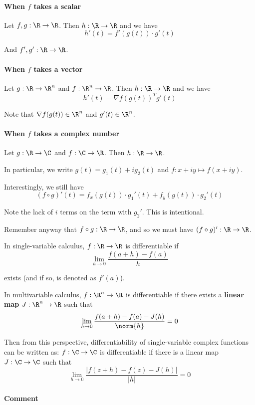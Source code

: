\paragraph{When $f$ takes a scalar} Let $f,g:\R\to\R$. Then $h:\R\to\R$ and we have
$$h'(t)=f'(g(t))\cdot g'(t)$$

And $f',g':\R\to\R$.

\paragraph{When $f$ takes a vector} Let $g:\R\to\R^n$ and $f:\R^n\to\R$. Then $h:\R\to\R$ and we have
$$h'(t)=\nabla f(g(t))^Tg'(t)$$

Note that $\nabla f(g(t))\in\R^n$ and $g'(t)\in\R^n$.

\paragraph{When $f$ takes a complex number} Let $g:\R\to\C$ and $f:\C\to\R$. Then $h:\R\to\R$.

In particular, we write $g(t)=g_1(t)+ig_2(t)$ and $f:x+iy\mapsto f(x+iy)$.

Interestingly, we still have
$$
  (f\circ g)'(t) =
  f_x(g(t))\cdot {g_1}'(t)+f_y(g(t))\cdot {g_2}'(t)
$$

Note the lack of $i$ terms on the term with ${g_2}'$. This is intentional.

Remember anyway that $f\circ g:\R\to\R$, and so we must have $(f\circ
g)':\R\to\R$.

\label{c62315d}

In single-variable calculus, $f:\R\to\R$ is differentiable if
$$
  \lim_{h\to0}\frac{f(a+h)-f(a)}h
$$

exists (and if so, is denoted as $f'(a)$).

In multivariable calculus, $f:\R^n\to\R$ is differentiable if there exists a
\textbf{linear map} $J:\R^n\to\R$ such that
$$
  \lim_{h\to0}\frac{f(a+h)-f(a)-J(h)}{\norm{h}}=0
$$

Then from this perspective, differentiability of single-variable complex
functions can be written as: $f:\C\to\C$ is differentiable if there is a linear
map $J:\C\to\C$ such that
$$
  \lim_{h\to0}\frac{|f(z+h)-f(z)-J(h)|}{|h|}=0
$$

\paragraph{Comment}

